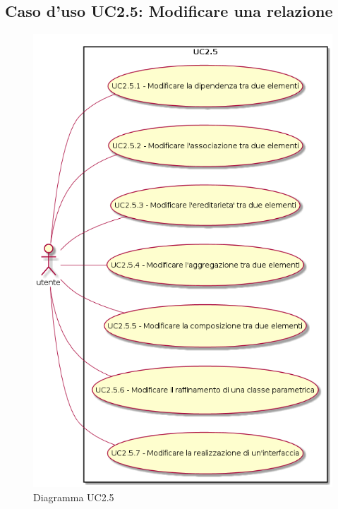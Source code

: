 \documentclass[../AnalisiDeiRequisiti.tex]{subfiles}
\begin{document}
		\subsection{Caso d'uso UC2.5: Modificare una relazione}
		\begin{figure} [H]
			\centering
			\includegraphics[scale=0.45]{./Figures/UC2_5.png}
			\caption{Diagramma UC2.5}\label{}
		\end{figure}
\end{document}
